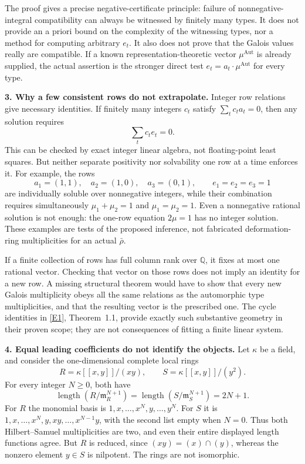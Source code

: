 \documentclass[11pt,a4paper]{article}
\newcommand{\Q}{\mathbb{Q}}
\newcommand{\eref}[2]{\hyperlink{extra:#1:#2}{[E#2]}}
\numberwithin{equation}{section}
\begin{document}
The proof gives a precise negative-certificate principle: failure of
nonnegative-integral compatibility can always be witnessed by finitely
many types. It does not provide an a priori bound on the complexity
of the witnessing types, nor a method for computing arbitrary $e_t$.
It also does not prove that the Galois values really are compatible.
If a known representation-theoretic vector $\mu^{\mathrm{Aut}}$ is
already supplied, the actual assertion is the stronger direct test
$e_t=a_t\cdot\mu^{\mathrm{Aut}}$ for every type.

\textbf{3. Why a few consistent rows do not extrapolate.}
Integer row relations give necessary identities. If finitely many
integers $c_t$ satisfy $\sum_t c_t a_t=0$, then any solution requires
\begin{equation}\label{228:rowrelation}
 \sum_t c_t e_t=0.
\end{equation}
This can be checked by exact integer linear algebra, not floating-point
least squares. But neither separate positivity nor solvability one row
at a time enforces it. For example, the rows
\[
 a_1=(1,1),\quad a_2=(1,0),\quad a_3=(0,1),
 \qquad e_1=e_2=e_3=1
\]
are individually soluble over nonnegative integers, while their
combination requires simultaneously $\mu_1+\mu_2=1$ and
$\mu_1=\mu_2=1$. Even a nonnegative rational solution is not enough:
the one-row equation $2\mu=1$ has no integer solution. These examples
are tests of the proposed inference, not fabricated deformation-ring
multiplicities for an actual $\bar\rho$.

If a finite collection of rows has full column rank over $\Q$, it fixes
at most one rational vector. Checking that vector on those rows does
not imply an identity for a new row. A missing structural theorem would
have to show that every new Galois multiplicity obeys all the same
relations as the automorphic type multiplicities, and that the resulting
vector is the prescribed one. The cycle identities in
\eref{228}{1}, Theorem~1.1, provide exactly such substantive geometry
in their proven scope; they are not consequences of fitting a finite
linear system.

\textbf{4. Equal leading coefficients do not identify the objects.}
Let $\kappa$ be a field, and consider the one-dimensional complete local
rings
\[
 R=\kappa[[x,y]]/(xy),\qquad S=\kappa[[x,y]]/(y^2).
\]
For every integer $N\ge0$, both have
\begin{equation}\label{228:length}
 \operatorname{length}(R/\mathfrak m_R^{N+1})
 =\operatorname{length}(S/\mathfrak m_S^{N+1})=2N+1.
\end{equation}
For $R$ the monomial basis is $1,x,\ldots,x^N,y,\ldots,y^N$.
For $S$ it is $1,x,\ldots,x^N,y,xy,\ldots,x^{N-1}y$, with the
second list empty when $N=0$. Thus both Hilbert--Samuel multiplicities
are two, and even their entire displayed length functions agree.
But $R$ is reduced, since $(xy)=(x)\cap(y)$, whereas the nonzero element
$y\in S$ is nilpotent. The rings are not isomorphic.
\end{document}
